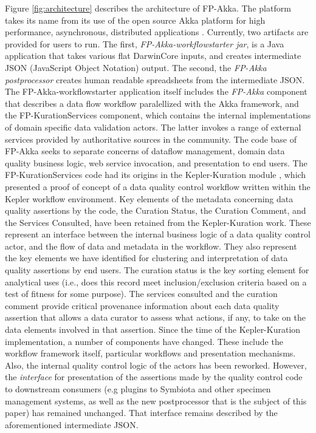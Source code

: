 \documentclass{article}
\begin{document}
Figure \ref{fig:architecture} describes the architecture of FP-Akka. The platform takes its name from its use of  the open source Akka platform for high performance, asynchronous, distributed applications \citep{akka_akka_2015}. Currently, two artifacts are provided for users to run. The first, \emph{FP-Akka-workflowstarter jar}, is a Java application that takes various flat DarwinCore inputs, and creates intermediate JSON (JavaScript Object Notation) \citep{ecmaJSON} output. The second, the \emph{FP-Akka postprocessor}  \citep{FP_postprocess} creates human readable spreadsheets from the intermediate JSON.  The FP-Akka-workflowstarter application itself includes the \emph{FP-Akka} component  that describes a data flow workflow paralellized with the Akka framework, and the FP-KurationServices component, which contains the internal implementations of domain specific data validation actors. The latter invokes a range of external services provided by authoritative sources in the community.   The code base of FP-Akka seeks to separate concerns of dataflow management, domain data quality business logic, web service invocation, and presentation to end users.  The FP-KurationServices code had its origins in the Kepler-Kuration module \citep{dou_kurator_2012, dou_scientific_2011}, which presented a proof of concept of a data quality control workflow written within the Kepler workflow environment.   Key elements of the metadata concerning data quality assertions by the code, the Curation Status, the Curation Comment, and the Services Consulted, have been retained from the Kepler-Kuration work. These represent an interface between the internal business logic of a data quality control actor, and the flow of data and metadata in the workflow. 
They also represent the key elements we have identified for clustering and interpretation of data quality assertions by end users.  The curation status is the key sorting element for analytical uses (i.e., does this record meet inclusion/exclusion criteria based on a test of fitness for some purpose).  The services consulted and the curation comment provide critical provenance information about each data quality assertion that allows a data curator to assess what actions, if any, to take on the data elements involved in that assertion.  
Since the time of the Kepler-Kuration implementation, a number of components have changed. These include the workflow framework itself, particular workflows and presentation mechanisms. Also, the internal quality control logic of the actors has been reworked. However, the \emph{interface} for presentation of the assertions made by the quality control code to downstream consumers (e.g plugins to Symbiota and other specimen management systems, as well as the new postprocessor that is the subject of this paper) has remained unchanged. That interface remains described by the aforementioned intermediate JSON.
\end{document}
